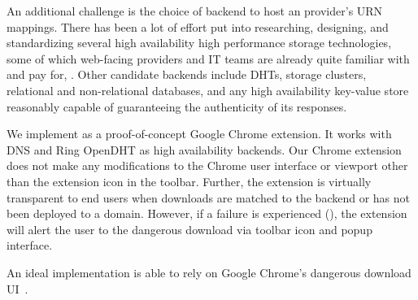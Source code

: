 An additional challenge is the choice of backend to host an provider's URN
mappings. There has been a lot of effort put into researching, designing, and
standardizing several high availability high performance storage technologies,
some of which web-facing providers and IT teams are already quite familiar with
and pay for, . Other candidate backends include
DHTs, storage clusters, relational and non-relational databases, and any high
availability key-value store reasonably capable of guaranteeing the authenticity
of its responses.

We implement \SYSTEM{} as a proof-of-concept Google Chrome extension. It works
with DNS and Ring OpenDHT as high availability backends. Our Chrome extension
does not make any modifications to the Chrome user interface or viewport other
than the extension icon in the toolbar. Further, the extension is virtually
transparent to end users when downloads are matched to the backend or \SYSTEM{}
has not been deployed to a domain. However, if a failure is experienced (), the extension will alert the user to the dangerous download via
toolbar icon and popup interface.


An ideal implementation is able to rely on Google Chrome's dangerous download
UI~\cite{ChromeClickThrough}.
